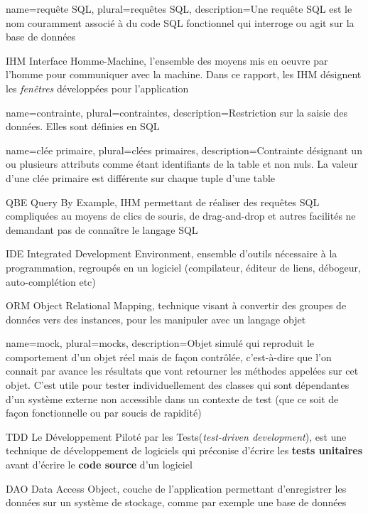         {name={requête SQL},
        plural={requêtes SQL},
        description={Une requête SQL est le nom couramment associé à du code SQL fonctionnel qui interroge ou agit sur la base de données}}

	{IHM}
	{Interface Homme-Machine, l'ensemble des moyens mis en oeuvre par l'homme pour communiquer avec la machine.
	Dans ce rapport, les IHM désignent les \textit{fenêtres} développées pour l'application}

        {name={contrainte},
        plural={contraintes},
        description={Restriction sur la saisie des données. Elles sont définies en SQL}}

        {name={clée primaire},
        plural={clées primaires},
        description={Contrainte désignant un ou plusieurs attributs comme étant identifiants de la table et non nuls. La valeur d'une clée primaire est différente sur chaque tuple d'une table}}

        {QBE}
        {Query By Example, IHM permettant de réaliser des requêtes SQL compliquées au moyens de clics de souris, de drag-and-drop et autres
        facilités ne demandant pas de connaître le langage SQL}

        {IDE}
        {Integrated Development Environment, ensemble d'outils nécessaire à la programmation, regroupés en un logiciel (compilateur, éditeur de liens, débogeur, auto-complétion etc)}
		

        {ORM}
        {Object Relational Mapping, technique visant à convertir des groupes de données vers des instances, pour les manipuler avec un langage objet}

		{
		name={mock},
		plural={mocks},
		description={Objet simulé qui reproduit le comportement d'un objet réel mais de façon contrôlée, c'est-à-dire que l'on connait par avance les résultats que vont retourner les méthodes appelées sur cet objet. C'est utile pour tester individuellement des classes qui sont dépendantes d'un système externe non accessible dans un contexte de test (que ce soit de façon fonctionnelle ou par soucis de rapidité)}
		}

	{TDD}
	{Le Développement Piloté par les Tests(\textit{test-driven development}), 
	est une technique de développement de logiciels qui préconise d'écrire les \textbf{tests unitaires} avant d'écrire le \textbf{code source} d'un logiciel}

        {DAO}
        {Data Access Object, couche de l'application permettant d'enregistrer les données sur un système de stockage, comme par exemple une base de données}
